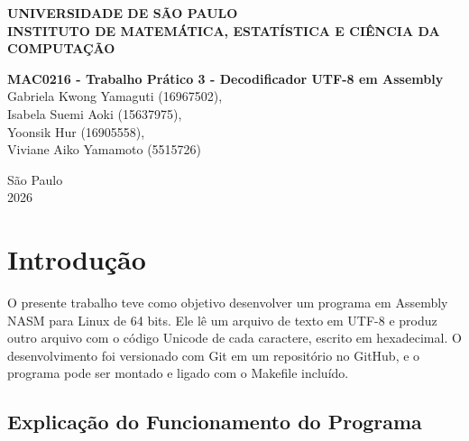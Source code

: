 \documentclass[12pt,a4paper]{article}
\begin{document}
\begin{titlepage}    
    \begin{center}     
        {\large \textbf{UNIVERSIDADE DE SÃO PAULO}} \\
        {\large \textbf{INSTITUTO DE MATEMÁTICA, ESTATÍSTICA E CIÊNCIA DA COMPUTAÇÃO}} \\

        \vspace{5cm}
        \vfill
        
        \begin{minipage}{0.8\textwidth}
            \centering
            {\Large \textbf{MAC0216 - Trabalho Prático 3 -  Decodificador UTF-8 em Assembly}} \\
            \vspace{0.8cm}
            {\large Gabriela Kwong Yamaguti (16967502),\\Isabela Suemi Aoki (15637975),\\Yoonsik Hur (16905558),\\Viviane Aiko Yamamoto (5515726)}
        \end{minipage}
        
        \vfill
        \vfill
        
        {\large São Paulo} \\
        {\large 2026}
    \end{center}
    
    \vspace*{\fill}
\end{titlepage}

\newpage
\tableofcontents
\thispagestyle{empty}

\newpage
{}

\section{Introdução}

O presente trabalho teve como objetivo desenvolver um programa em Assembly NASM para Linux de 64 bits. Ele lê um arquivo de texto em UTF-8 e produz outro arquivo com o código Unicode de cada caractere, escrito em hexadecimal. O desenvolvimento foi versionado com Git em um repositório no GitHub, e o programa pode ser montado e ligado com o Makefile incluído.

\subsection{Explicação do Funcionamento do Programa}
\end{document}
